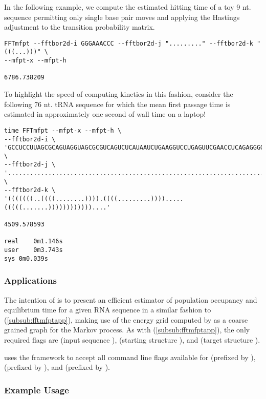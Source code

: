 \documentclass[11pt]{article}
\begin{document}
In the following example, we compute the estimated hitting time of a toy 9 nt. sequence permitting only single base pair moves and applying the Hastings adjustment to the transition probability matrix.

\begin{verbatim}
FFTmfpt --fftbor2d-i GGGAAACCC --fftbor2d-j "........." --fftbor2d-k "(((...)))" \
--mfpt-x --mfpt-h

6786.738209
\end{verbatim}

To highlight the speed of computing kinetics in this fashion, consider the following 76 nt. tRNA sequence for which the mean first passage time is estimated in approximately one second of wall time on a laptop!

\begin{verbatim}
time FFTmfpt --mfpt-x --mfpt-h \
--fftbor2d-i \
'GCCUCCUUAGCGCAGUAGGUAGCGCGUCAGUCUCAUAAUCUGAAGGUCCUGAGUUCGAACCUCAGAGGGGGCACCA' \
--fftbor2d-j \
'............................................................................' \
--fftbor2d-k \
'(((((((..((((........)))).((((.........)))).....(((((.......))))))))))))....'

4509.578593

real	0m1.146s
user	0m3.743s
sys	0m0.039s
\end{verbatim}


\subsubsection{Applications} \label{subsub:ffteqapp}

The intention of \ffteq is to present an efficient estimator of population occupancy and equilibrium time for a given RNA sequence in a similar fashion to \fftmfpt (\ref{subsub:fftmfptapp}), making use of the energy grid computed by \fft as a coarse grained graph for the Markov process. As with \fftmfpt (\ref{subsub:fftmfptapp}), the only required flags are  (input sequence \s),  (starting structure \A), and  (target structure \B).

\fftmfpt uses the \multiParam framework to accept all command line flags available for \fft (prefixed by ), \rnamfpt (prefixed by ), and \rnaeq (prefixed by ).

\subsubsection{Example Usage} \label{subsub:ffteqex}
\end{document}
